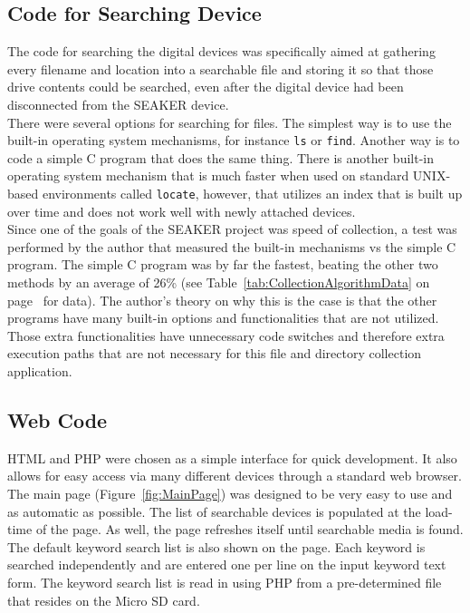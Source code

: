 \documentclass[12pt]{article}
\begin{document}
\subsection{Code for Searching Device}

The code for searching the digital devices was specifically aimed at gathering
every filename and location into a searchable file and storing it so that
those drive contents could be searched, even after the digital device had been
disconnected from the SEAKER device.\\

There were several options for searching for files.  The simplest way is to use
the built-in operating system mechanisms, for instance \verb|ls| or \verb|find|.
Another way is to code a simple C program that does the same thing.  There is
another built-in operating system mechanism that is much faster when used on
standard UNIX-based environments called \verb|locate|, however, that utilizes
an index that is built up over time and does not work well with newly
attached devices.\\

Since one of the goals of the SEAKER project was speed of collection, a test
was performed by the author that
measured the built-in mechanisms vs the simple C program.  The simple C program
was by far the fastest, beating the other two methods by an average of 26\%
(see Table~\ref{tab:CollectionAlgorithmData} on
page~\pageref{tab:CollectionAlgorithmData} for data).
The author's theory on why this is the case is that the other programs have many
built-in options and functionalities that are not utilized.  Those extra
functionalities have unnecessary code switches and therefore extra
execution paths that are not necessary for this file and directory collection
application.\\

\subsection{Web Code}

HTML and PHP were chosen as a simple interface for quick development.  It also
allows for easy access via many different devices through a standard web 
browser.\\

The main page (Figure~\ref{fig:MainPage}) was designed to be very easy to use
and as automatic as possible.
The list of searchable devices is populated at the load-time of the page.  As
well, the page refreshes itself until searchable media is found.  The 
default keyword search list is also shown on the page.  Each keyword is
searched independently and are entered one per line on the input keyword
text form.  The keyword search list is read in using
PHP from a pre-determined file that resides on the Micro SD card.\\
\end{document}
